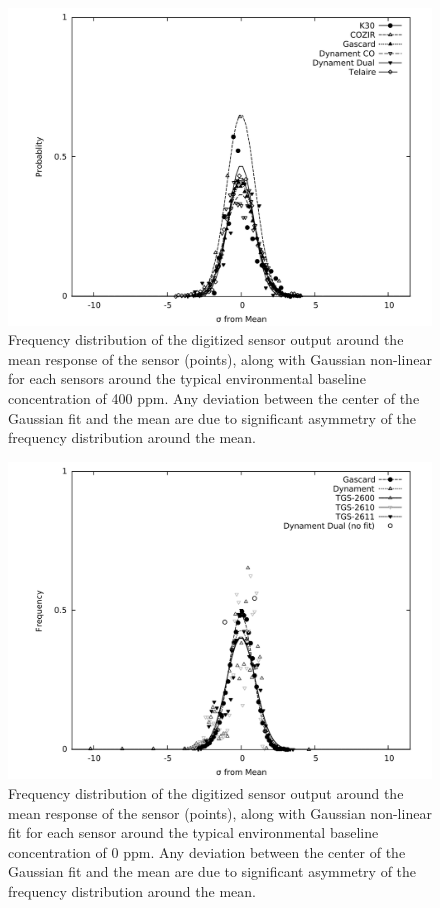 \documentclass[sensors,article,submit,moreauthors,pdftex]{Definitions/mdpi}
\begin{document}
	
			\begin{figure}[!t]
				\centering
				\includegraphics[width=\columnwidth]{honey7.pdf}
				\caption{Frequency distribution of the digitized sensor output around the mean response of the sensor (points), along with Gaussian non-linear for each  sensors around the typical environmental baseline concentration of 400 ppm.
				Any deviation between the center of the Gaussian fit and the mean are due to significant asymmetry of the frequency distribution around the mean.}
				\label{fig:gaussco2}
			\end{figure}
			
			\begin{figure}[!t]
				\centering
				\includegraphics[width=\columnwidth]{honey8.pdf}
				\caption{Frequency distribution of the digitized sensor output around the mean response of the sensor (points), along with Gaussian non-linear fit for each  sensor around the typical environmental baseline concentration of 0 ppm.
				Any deviation between the center of the Gaussian fit and the mean are due to significant asymmetry of the frequency distribution around the mean.}
				\label{fig:gaussch4}
			\end{figure}
			
\end{document}
